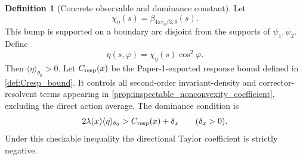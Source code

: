 \documentclass[11pt]{amsart}
\theoremstyle{definition}
\newtheorem{definition}[theorem]{Definition}
\theoremstyle{remark}
\begin{document}
\begin{definition}[Concrete observable and dominance constant]
\label{def:concrete_eta_dominance}
Let
\[
  \chi_\eta(s)=\beta_{4\pi r_0/3,\delta}(s).
\]
This bump is supported on a boundary arc disjoint from the supports of
$\psi_1,\psi_2$.  Define
\begin{equation}
  \eta(s,\varphi)=\chi_\eta(s)\cos^2\varphi .
\end{equation}
Then $\langle\eta\rangle_{\theta_0}>0$.  Let $C_{\rm resp}(x)$ be the
Paper-1-exported response bound defined in \cref{def:Cresp_bound}.  It controls
all second-order invariant-density and corrector-resolvent terms appearing in
\cref{prop:inspectable_nonconvexity_coefficient}, excluding the direct action
average.  The dominance condition is
\begin{equation}
  2\lambda(x)\langle\eta\rangle_{\theta_0}
  >
  C_{\rm resp}(x)+\delta_x
  \qquad(\delta_x>0).
\end{equation}
Under this checkable inequality the directional Taylor coefficient is strictly
negative.
\end{definition}
\end{document}
